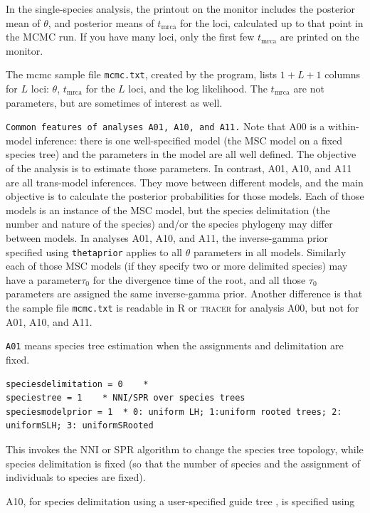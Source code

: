 \documentclass[a4paper]{book}
\numberwithin{equation}{section} \renewcommand{\baselinestretch}{0.55}
\begin{document}
\newpage
In the single-species analysis, the printout on the monitor includes
the posterior mean of $\theta$, and posterior means of
$t_{\mathrm{mrca}}$ for the loci, calculated up to that point in the
MCMC run.  If you have many loci, only the first few
$t_{\mathrm{mrca}}$ are printed on the monitor.

The mcmc sample file \texttt{mcmc.txt}, created by the program, lists $1 + L + 1$ columns for $L$ loci: $\theta$,
$t_{\mathrm{mrca}}$ for the $L$ loci, and the log likelihood.  The
$t_{\mathrm{mrca}}$ are not parameters, but are sometimes of interest
as well.

\texttt{Common features of analyses A01, A10, and A11.}  Note that A00
is a within-model inference: there is one well-specified model (the
MSC model on a fixed species tree) and the parameters in the model are
all well defined.  The objective of the analysis is to estimate those
parameters.  In contrast, A01, A10, and A11 are all trans-model
inferences. They move between different models, and the main objective
is to calculate the posterior probabilities for those models.  Each of
those models is an instance of the MSC model, but the species
delimitation (the number and nature of the species) and/or the species
phylogeny may differ between models.  In analyses A01, A10, and A11,
the inverse-gamma prior specified using \texttt{thetaprior} applies to
all $\theta$ parameters in all models.  Similarly each of those MSC
models (if they specify two or more delimited species) may have a
parameter$\tau_0$ for the divergence time of the root, and all those
$\tau_0$ parameters are assigned the same inverse-gamma prior. Another
difference is that the sample file \texttt{mcmc.txt} is readable in R
or \textsc{tracer} for analysis A00, but not for A01, A10, and A11.

\texttt{A01} means species tree estimation when the assignments and
delimitation are fixed.
\begin{verbatim}
speciesdelimitation = 0    *
speciestree = 1    * NNI/SPR over species trees
speciesmodelprior = 1  * 0: uniform LH; 1:uniform rooted trees; 2: uniformSLH; 3: uniformSRooted
\end{verbatim}

This invokes the NNI or SPR algorithm to change the species tree
topology, while species delimitation is fixed (so that the number of
species and the assignment of individuals to species are fixed).

A10, for species delimitation using a user-specified guide tree
\citep{Yang2010, Rannala2013}, is specified using
\end{document}
